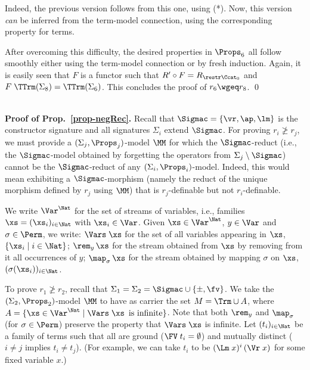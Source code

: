 		Indeed, the previous version follows from this one, using (*). Now, this version \emph{can} be inferred from the term-model connection, using the corresponding property for terms. 
		
		After overcoming this difficulty, the desired properties in $\Props_6$ all follow smoothly either using the term-model connection or by fresh induction. Again, it is easily seen that $F$ is a functor such that $R' \circ F = R_{\restr\Ccat_0}$ and 
		$F\;\TTrm(\Sigma_8) = \TTrm(\Sigma_6)$. This concludes the proof of $r_6 \wgeq r_8$.  
		\qed

\ \\
\textbf{Proof of Prop.~\ref{prop-negRec}.}  
% 
Recall that $\Sigmac = \{\vr,\ap,\lm\}$ is the constructor signature and all %
signatures $\Sigma_i$ extend $\Sigmac$. For proving $r_i \not\geq r_j$, we must provide a $(\Sigma_j,\Props_j)$-model $\MM$ for which the $\Sigmac$-reduct (i.e., the $\Sigmac$-model obtained by forgetting the operators from $\Sigma_j \setminus \Sigmac$) cannot be the $\Sigmac$-reduct of any $(\Sigma_i,\Props_i)$-model. 
Indeed, this would mean exhibiting a $\Sigmac$-morphism 
(namely the reduct of the unique morphism defined by $r_j$ using $\MM$) 
that is $r_j$-definable but not $r_i$-definable. 

\smallskip
We write $\Var^\Nat$ for the set of streams of variables, i.e., families $\xs = (\xs_i)_{i\in \Nat}$ with $\xs_i \in \Var$. Given $\xs \in \Var^\Nat$, $y\in\Var$ and $\sigma\in\Perm$, we write: 
$\Vars\;\xs$ for the set of all variables appearing in $\xs$, $\{\xs_i \mid i \in \Nat\}$; 
$\rem_{y}\,\xs$ for the stream obtained from $\xs$ by removing from it all occurrences of $y$; 
$\map_\sigma\,\xs$ for the stream obtained by mapping $\sigma$ on $\xs$, 
$(\sigma(\xs_i))_{i\in \Nat}$. 

To prove $r_1 \not\geq r_2$, recall that $\Sigma_1 = \Sigma_2 = \Sigmac \cup \{\pm,\fv\}$. We take the $(\Sigma_2,\Props_2)$-model $\MM$ to have as carrier the set $M = \Trm \cup A$, where $A = \{\xs \in \Var^\Nat \mid \Vars\;\xs \,\mbox{ is  infinite}\}$. Note that both $\rem_y$ and $\map_\sigma$ (for $\sigma\in \Perm$) preserve the property that $\Vars\;\xs$ is infinite. Let $(t_i)_{i\in \Nat}$ be a family of terms such that all are ground ($\FV\;t_i = \emptyset$)
and mutually distinct ($i\not=j$ implies $t_i \not=t_j$). (For example, we can take $t_i$ to be $(\Lm\;x)^i\,(\Vr\;x)$ for some fixed variable $x$.) 


